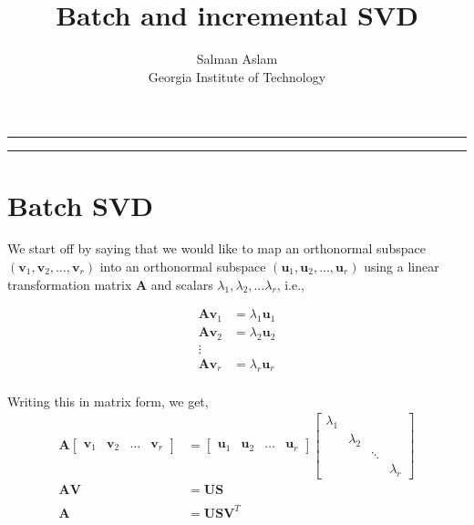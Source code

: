 
\title{Batch and incremental SVD}
\author{Salman Aslam\\ Georgia Institute of Technology}
\date{}

\maketitle
\rule[0pt]{\textwidth}{1pt}
\tableofcontents
\rule[0pt]{\textwidth}{1pt}

\section{Batch SVD}
We start off by saying that we would like to map an orthonormal subspace $(\mathbf{v}_1, \mathbf{v}_2, \ldots, \mathbf{v}_r)$ into an orthonormal subspace $(\mathbf{u}_1, \mathbf{u}_2, \ldots, \mathbf{u}_r)$ using a linear transformation matrix $\mathbf{A}$ and scalars $\lambda_1, \lambda_2, \ldots \lambda_r$, i.e., 

\begin{equation}
\begin{array}{ll}
\mathbf{A}\mathbf{v}_1 &= \lambda_1 \mathbf{u}_1\\ 
\mathbf{A}\mathbf{v}_2 &= \lambda_2 \mathbf{u}_2\\ 
\vdots\\
\mathbf{A}\mathbf{v}_r &= \lambda_r \mathbf{u}_r\\ 
\end{array}
\end{equation}

Writing this in matrix form, we get,
\begin{equation}
\begin{array}{ll}
\mathbf{A}\left[\begin{array}{cccc}\mathbf{v}_1 & \mathbf{v}_2 &\ldots &\mathbf{v}_r\end{array}\right] &=\left[\begin{array}{cccc}\mathbf{u}_1 & \mathbf{u}_2 &\ldots & \mathbf{u}_r\end{array}\right]\left[\begin{array}{cccc}\lambda_1 &  & & \\& \lambda_2 & & \\& & \ddots &  \\& & & \lambda_r\end{array}\right]\\
\mathbf{A}\mathbf{V} &=\mathbf{U} \mathbf{S}\\ \\
\mathbf{A} &=\mathbf{U} \mathbf{S} \mathbf{V}^T \\
\end{array}
\end{equation}

